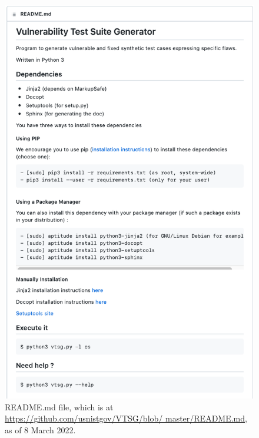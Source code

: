 \documentclass[12pt]{article}
\begin{document}
\begin{figure}[htbp]
  \includegraphics[width=0.8\linewidth]{fig_README_md.png}
  \caption{README.md file, which is at
    \href{https://github.com/usnistgov/VTSG/blob/master/README.md}
         {https://github.com/usnistgov/VTSG/blob/ master/README.md},
    as of 8 March 2022.}
  \label{fig:README.md file}
\end{figure}


\end{document}
